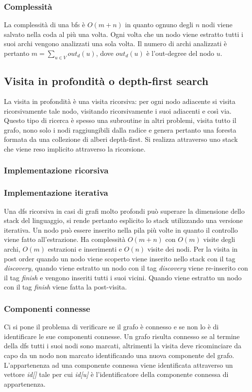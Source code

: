\subsubsection{Complessit\`a}
La complessit\`a di una bfs \`e $O(m+n)$ in quanto ognuno degli $n$ nodi viene salvato nella coda al pi\`u una volta. Ogni volta che un nodo viene estratto
tutti i suoi archi vengono analizzati una sola volta. Il numero di archi analizzati \`e pertanto $m=\sum\limits_{u\in V}out_d(u)$, dove $out_d(u)$ \`e 
l'out-degree del nodo $u$. 
\subsection{Visita in profondit\`a o depth-first search}
La visita in profondit\`a \`e una visita ricorsiva: per ogni nodo adiacente si visita ricorsivamente tale nodo, visitando ricorsivamente i suoi adiacenti
e cos\`i via. Questo tipo di ricerca \`e spesso una subroutine in altri problemi, visita tutto il grafo, nono solo i nodi raggiungibili dalla radice e
genera pertanto una foresta formata da una collezione di alberi depth-first. Si realizza attraverso uno stack che viene reso implicito attraverso la 
ricorsione.
\subsubsection{Implementazione ricorsiva}

\subsubsection{Implementazione iterativa}
Una dfs ricorsiva in casi di grafi molto profondi pu\`o superare la dimensione dello stack del linguaggio, si rende pertanto esplicito lo stack utilizzando 
una versione iterativa. Un nodo pu\`o essere inserito nella pila pi\`u volte in quanto il controllo viene fatto all'estrazione. Ha complessit\`a $O(m+n)$ 
con $O(m)$ visite degli archi, $O(m)$ estrazioni e inserimenti e $O(n)$ visite dei nodi. Per la visita in post order quando un nodo viene scoperto viene
inserito nello stack con il tag \emph{discovery}, quando viene estratto un nodo con il tag \emph{discovery} viene re-inserito con il tag \emph{finish} e 
vengono inseriti tutti i suoi vicini. Quando viene estratto un nodo con il tag \emph{finish} viene fatta la post-visita.

\newpage
\subsubsection{Componenti connesse}
Ci si pone il problema di verificare se il grafo \`e connesso e se non lo \`e di identificare le sue componenti connesse. Un grafo risulta connesso se al
termine della dfs tutti i suoi nodi sono marcati, altrimenti la visita deve ricominciare da capo da un nodo non marcato identificando una nuova componente
del grafo. L'appartenenza ad una componente connessa viene identificata attraverso un vettore \emph{id[]} tale per cui \emph{id[u]} \`e l'identificatore
della componente connessa di appartenenza.
\begin{multicols}{2}

\columnbreak

\end{multicols}
